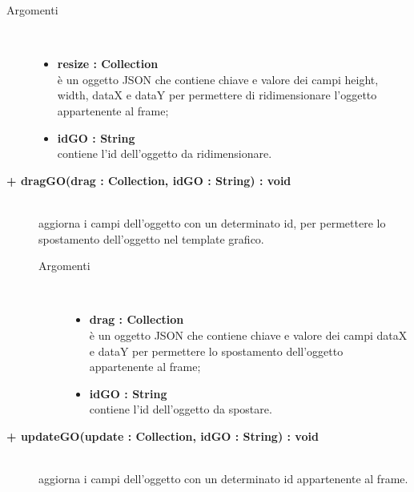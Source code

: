 \begin{description}
\begin{description}
\begin{description}
\begin{description}
			\item[Argomenti] \hfill \\
				\begin{itemize}
					\item \textbf{resize : Collection			} \hfill \\
					è un oggetto JSON che contiene chiave e valore dei campi height, width, dataX e dataY per permettere di ridimensionare l'oggetto appartenente al frame;
					\item \textbf{idGO : String			} \hfill \\
					contiene l'id dell'oggetto da ridimensionare.
				\end{itemize}

\end{description}

\end{description}

\begin{description}
		\item[\textbf{+ dragGO(drag : Collection, idGO : String) : void			}] \hfill \\
			aggiorna i campi dell'oggetto con un determinato id, per permettere lo spostamento dell'oggetto nel template grafico.    

\begin{description}
			\item[Argomenti] \hfill \\
				\begin{itemize}
					\item \textbf{drag : Collection			} \hfill \\
					è un oggetto JSON che contiene chiave e valore dei campi dataX e dataY per permettere lo spostamento dell'oggetto appartenente al frame;
					\item \textbf{idGO : String			} \hfill \\
					contiene l'id dell'oggetto da spostare.
				\end{itemize}

\end{description}

\end{description}

\begin{description}
		\item[\textbf{+ updateGO(update : Collection, idGO : String) : void			}] \hfill \\
			aggiorna i campi dell'oggetto con un determinato id appartenente al frame.  


\end{description}
\end{description}
\end{description}
